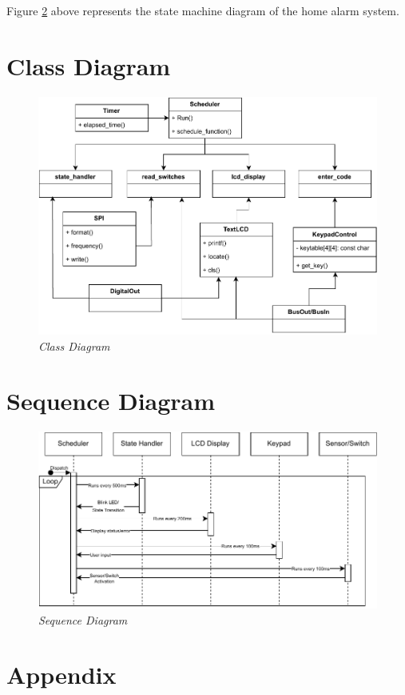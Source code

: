 \documentclass[aps, secnumarabic, balancelastpage, asmath, amssymb, nofootinbib, floatfix,]{revtex4-2}
\begin{document}
{Figure \ref{fig:image1} above represents the state machine diagram of the home alarm system. 



\clearpage

\section{\fontsize{11.3pt}{12pt}\selectfont \bf Class Diagram}
\fontsize{11pt}{12pt}\selectfont
\label{sec:3}


\begin{figure}[h]
  \centering
  \includegraphics[scale = 1.1]{class.drawio.pdf}
  \caption{\em Class Diagram}
  \label{fig:image1}
\end{figure}



\clearpage

\section{\fontsize{11.3pt}{12pt}\selectfont \bf Sequence Diagram}
\fontsize{11pt}{12pt}\selectfont
\label{sec:4}

\begin{figure}[h]
  \centering
  \includegraphics[scale = 1.2]{seq.drawio.pdf}
  \caption{\em Sequence Diagram}
  \label{fig:image1}
\end{figure}



\clearpage

\section{\fontsize{11.3pt}{12pt}\selectfont \bf Appendix}
\fontsize{11pt}{12pt}\selectfont
\label{sec:5}


}
\end{document}
